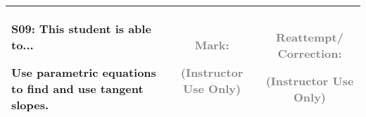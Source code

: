 \documentclass[12pt]{article}
\newcommand{\standardQuestion}[2]{
\newpage
\begin{center}
  \begin{tabular}{|l|c|c|}
  \hline
    \parbox{4in}{
      \textbf{#1}: This student is able to...\\
      #2
    }
  &
    \parbox{1in}{
      \vspace{0.1in}
      \footnotesize \textcolor{gray}{Mark:}
      \vspace{0.7in}

      \tiny \textcolor{gray}{(Instructor Use Only)}
    }
  &
    \parbox{1in}{
      \vspace{0.1in}
      \footnotesize \textcolor{gray}{Reattempt/ Correction:}
      \vspace{0.53in}

      \tiny \textcolor{gray}{(Instructor Use Only)}
    }
  \\\hline
  \end{tabular}
\end{center}
}
\begin{document}
%
%
%
%
%
%
%
%
%
%
%
%
%
%
%
%




%



%
%
%
%
%
%
%
%
%
%
%



\standardQuestion{S09}{
  Use parametric equations to find and use tangent slopes.
}
\end{document}
